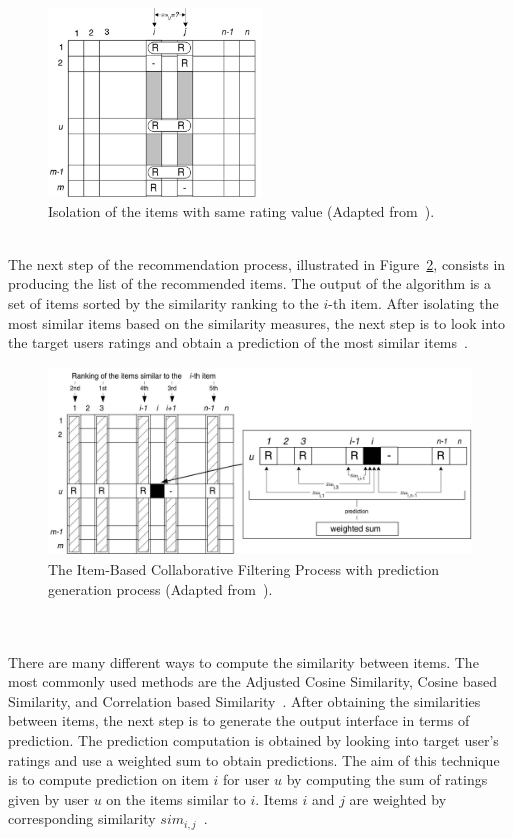\begin{figure}[h!]
 \centering
   \includegraphics[height=5.0cm]{./images/flows/flow_item_based_filtering_1.jpg}
   \caption{Isolation of the items with same rating value (Adapted from~\cite{ibCollabrativeVSGK}).}
   \label{fig:ibcfProcessStep1}
\end{figure}\\
The next step of the recommendation process, illustrated in Figure~\ref{fig:ibcfProcessStep2}, consists in producing the list of the recommended items. The output of the algorithm is a set of items sorted by the similarity ranking to the $i$-th item. After isolating the most similar items based on the similarity measures, the next step is to look into the target users ratings and obtain a prediction of the most similar items~\cite{ibCollabrativeVSGK}.
\begin{figure}[h!]
 \centering
   \includegraphics[height=5.0cm]{./images/flows/flow_item_based_filtering_2.jpg}
   \caption{The Item-Based Collaborative Filtering Process with prediction generation process (Adapted from~\cite{ibCollabrativeVSGK}).}
   \label{fig:ibcfProcessStep2}
\end{figure}\\
\\
There are many different ways to compute the similarity between items. The most commonly used methods are the Adjusted Cosine Similarity, Cosine based Similarity, and Correlation based Similarity~\cite{ibCollabrativeVSGK}. After obtaining the similarities between items, the next step is to generate the output interface in terms of prediction. The prediction computation is obtained by looking into target user's ratings and use a weighted sum to obtain predictions. The aim of this technique is to compute prediction on item $i$ for user $u$ by computing the sum of ratings given by user $u$ on the items similar to $i$. Items $i$ and $j$ are weighted by corresponding similarity $sim_{i,j}$~\cite{ibCollabrativeVSGK}.\\
